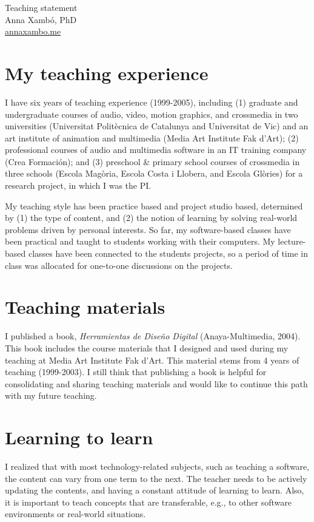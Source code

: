 \documentclass[10pt, a4paper]{article}
\begin{document}
{\LARGE Teaching statement}\\[0.2cm]
Anna Xambó, PhD\\
\href{http://annaxambo.me}{annaxambo.me}

\section*{My teaching experience}

I have six years of teaching experience (1999-2005), including (1) graduate and undergraduate courses of audio, video, motion graphics, and crossmedia in two universities (Universitat Politècnica de Catalunya and Universitat de Vic) and an art institute of animation and multimedia (Media Art Institute Fak d’Art); (2) professional courses of audio and multimedia software in an IT training company (Crea Formación); and (3) preschool \& primary school courses of crossmedia in three schools (Escola Magòria, Escola Costa i Llobera, and Escola Glòries) for a research project, in which I was the PI. 

My teaching style has been practice based and project studio based, determined by (1) the type of content, and (2) the notion of learning by solving real-world problems driven by personal interests. So far, my software-based classes have been practical and taught to students working with their computers. My lecture-based classes have been connected to the students projects, so a period of time in class was allocated for one-to-one discussions on the projects.

\section*{Teaching materials}

I published a book, \emph{Herramientas de Diseño Digital} (Anaya-Multimedia, 2004). This book includes the course materials that I designed and used during my teaching at Media Art Institute Fak d'Art. This material stems from 4 years of teaching (1999-2003). I still think that publishing a book is helpful for consolidating and sharing teaching materials and would like to continue this path with my future teaching.

\section*{Learning to learn}

I realized that with most technology-related subjects, such as teaching a software, the content can vary from one term to the next. The teacher needs to be actively updating the contents, and having a constant attitude of learning to learn. Also, it is important to teach concepts that are transferable, e.g., to other software environments or real-world situations.
\end{document}
